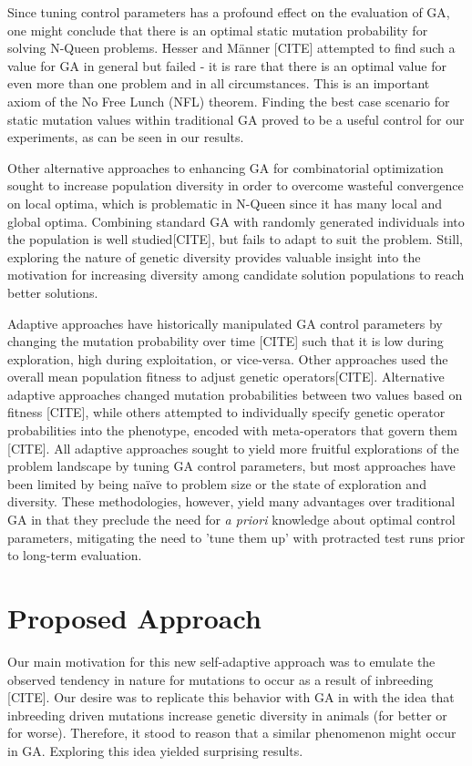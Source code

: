 \documentclass[conference]{IEEEtran}
\begin{document}
Since tuning control parameters has a profound effect on the evaluation of GA, one might conclude that there is an optimal static mutation probability for solving N-Queen problems. Hesser and M\"{a}nner [CITE] attempted to find such a value for GA in general but failed - it is rare that there is an optimal value for even more than one problem and in all circumstances. This is an important axiom of the No Free Lunch (NFL) theorem. Finding the best case scenario for static mutation values within traditional GA proved to be a useful control for our experiments, as can be seen in our results.

Other alternative approaches to enhancing GA for combinatorial optimization sought to increase population diversity in order to overcome wasteful convergence on local optima, which is problematic in N-Queen since it has many local and global optima. Combining standard GA with randomly generated individuals into the population is well studied[CITE], but fails to adapt to suit the problem. Still, exploring the nature of genetic diversity provides valuable insight into the motivation for increasing diversity among candidate solution populations to reach better solutions.

Adaptive approaches have historically manipulated GA control parameters by changing the mutation probability over time [CITE] such that it is low during exploration, high during exploitation, or vice-versa. Other approaches used the overall mean population fitness to adjust genetic operators[CITE]. Alternative adaptive approaches changed mutation probabilities between two values based on fitness [CITE], while others attempted to individually specify genetic operator probabilities into the phenotype, encoded with meta-operators that govern them [CITE]. All adaptive approaches sought to yield more fruitful explorations of the problem landscape by tuning GA control parameters, but most approaches have been limited by being na\"{i}ve to problem size or the state of exploration and diversity. These methodologies, however, yield many advantages over traditional GA in that they preclude the need for \textit{a priori} knowledge about optimal control parameters, mitigating the need to 'tune them up' with protracted test runs prior to long-term evaluation.

\section{Proposed Approach}\label{params}
Our main motivation for this new self-adaptive approach was to emulate the observed tendency in nature for mutations to occur as a result of inbreeding [CITE]. Our desire was to replicate this behavior with GA in with the idea that inbreeding driven mutations increase genetic diversity in animals (for better or for worse). Therefore, it stood to reason that a similar phenomenon might occur in GA. Exploring this idea yielded surprising results.
\end{document}
